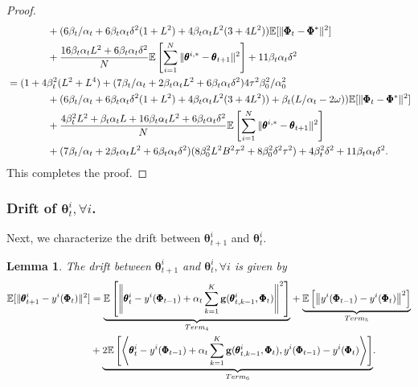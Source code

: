 \documentclass{article} %
\theoremstyle{plain}
\newtheorem{lemma}[theorem]{Lemma}
\theoremstyle{definition}
\theoremstyle{remark}
\begin{document}
{\begin{proof}
\begin{align*}
    &\qquad\qquad+(6\beta_t/\alpha_t+6\beta_t\alpha_t\delta^2(1+L^2) +4\beta_t\alpha_tL^2(3+4L^2))\mathbb{E}[\|\pmb{\Phi}_t-\pmb{\Phi}^*\|^2]\nonumber\allowdisplaybreaks\\
    &\qquad\qquad+\frac{16\beta_t \alpha_t L^2+6\beta_t\alpha_t\delta^2}{N}\mathbb{E}\left[\sum_{i=1}^N\|\pmb{\theta}^{i,*}-\pmb{\theta}_{t+1}\|^2\right]+11\beta_t\alpha_t\delta^2\allowdisplaybreaks\\
    &=(1+4\beta_t^2(L^2+L^4)+(7\beta_t/\alpha_t+2\beta_t\alpha_tL^2+6\beta_t\alpha_t\delta^2)4\tau^2\beta_0^2/\alpha_0^2\nonumber\allowdisplaybreaks\\
    &\qquad\qquad+(6\beta_t/\alpha_t+6\beta_t\alpha_t\delta^2(1+L^2) +4\beta_t\alpha_tL^2(3+4L^2))+\beta_t(L/\alpha_t-2\omega))\mathbb{E}[\|\pmb{\Phi}_t-\pmb{\Phi}^*\|^2]\nonumber\allowdisplaybreaks\\
    &\qquad\qquad+\frac{4\beta_t^2L^2+\beta_t\alpha_tL+16\beta_t\alpha_t L^2+6\beta_t\alpha_t \delta^2}{N}\mathbb{E}\left[\sum_{i=1}^N\|\pmb{\theta}^{i,*}-\pmb{\theta}_{t+1}\|^2\right]\allowdisplaybreaks\\
    &\qquad\qquad+(7\beta_t/\alpha_t+2\beta_t\alpha_t L^2+6\beta_t\alpha_t\delta^2)(8\beta_0^2L^2B^2\tau^2 +8\beta_0^2\delta^2\tau^2)+4\beta_t^2\delta^2+11\beta_t\alpha_t\delta^2.
\end{align*}
This completes the proof. 

\end{proof}


\subsubsection{Drift of $\pmb{\theta}_t^i, \forall i$.}\label{sec:theta_drift}

{Next, we characterize the drift between $\pmb{\theta}_{t+1}^i$ and $\pmb{\theta}_{t}^i$.}
\begin{lemma}
The drift between $\pmb{\theta}_{t+1}^i$ and $\pmb{\theta}_t^i, \forall i$ is given by
\begin{align}\label{eq:Lemma_E8}
    \mathbb{E}[\|\pmb{\theta}^i_{t+1}-y^i(\pmb{\Phi}_t)\|^2]
    &=\underset{Term_4}{\underbrace{\mathbb{E} \left[\left\|\pmb{\theta}_{t}^i-y^i(\pmb{\Phi}_{t-1})+\alpha_t\sum_{k=1}^K\bg(\pmb{\theta}_{t,k-1}^i,\pmb{\Phi}_t)\right\|^2\right]}}+\underset{Term_5}{\underbrace{\mathbb{E}\left[\left\|y^i(\pmb{\Phi}_{t-1})-y^i(\pmb{\Phi}_{t})\right\|^2\right]}}\nonumber\allowdisplaybreaks\\
    &+\underset{Term_6}{\underbrace{2\mathbb{E}\left[\left\langle\pmb{\theta}_{t}^i-y^i(\pmb{\Phi}_{t-1})+\alpha_t\sum_{k=1}^K\bg(\pmb{\theta}_{t,k-1}^i,\pmb{\Phi}_t),y^i(\pmb{\Phi}_{t-1})-y^i(\pmb{\Phi}_{t})\right\rangle\right]}}.
\end{align}


\end{lemma}}
\end{document}
